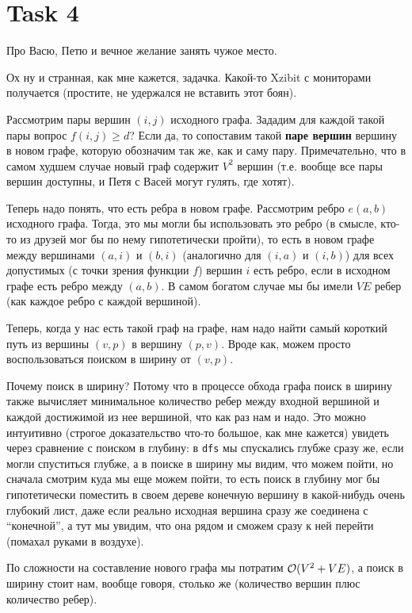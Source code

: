 \section{Task 4}
\begin{task}
    Про Васю, Петю и вечное желание занять чужое место.
\end{task}

Ох ну и странная, как мне кажется, задачка. Какой-то Xzibit с мониторами получается (простите, не удержался не вставить этот боян).
\begin{solution}
    Рассмотрим пары вершин $(i,j)$ исходного графа. Зададим для каждой такой пары вопрос $f(i,j) \geq d$? Если да, то сопоставим такой \textbf{паре вершин} вершину в новом графе, которую обозначим так же, как и саму пару. Примечательно, что в самом худшем случае новый граф содержит $V^2$ вершин (т.е. вообще все пары вершин доступны, и Петя с Васей могут гулять, где хотят).

    Теперь надо понять, что есть ребра в новом графе. Рассмотрим ребро $e(a, b)$ исходного графа. Тогда, это мы могли бы использовать это ребро (в смысле, кто-то из друзей мог бы по нему гипотетически пройти), то есть в новом графе между вершинами $(a, i)$ и $(b, i)$ (аналогично для $(i, a)$ и $(i, b)$) для всех допустимых (с точки зрения функции $f$) вершин $i$ есть ребро, если в исходном графе есть ребро между $(a, b)$. В самом богатом случае мы бы имели $VE$ ребер (как каждое ребро с каждой вершиной).

    Теперь, когда у нас есть такой граф на графе, нам надо найти самый короткий путь из вершины $(v, p)$ в вершину $(p, v)$. Вроде как, можем просто воспользоваться поиском в ширину от $(v, p)$.
    
    Почему поиск в ширину? Потому что в процессе обхода графа поиск в ширину также вычисляет минимальное количество ребер между входной вершиной и каждой достижимой из нее вершиной, что как раз нам и надо. Это можно интуитивно (строгое доказательство что-то большое, как мне кажется) увидеть через сравнение с поиском в глубину: в \texttt{dfs} мы спускались глубже сразу же, если могли спуститься глубже, а в поиске в ширину мы видим, что можем пойти, но сначала смотрим куда мы еще можем пойти, то есть поиск в глубину мог бы гипотетически поместить в своем дереве конечную вершину в какой-нибудь очень глубокий лист, даже если реально исходная вершина сразу же соединена с ``конечной'', а тут мы увидим, что она рядом и сможем сразу к ней перейти (помахал руками в воздухе).

    По сложности на составление нового графа мы потратим $\mathcal{O}(V^2 + VE)$, а поиск в ширину стоит нам, вообще говоря, столько же (количество вершин плюс количество ребер).
\end{solution}